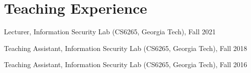 \section*{Teaching Experience}
\begin{description}

\item Lecturer, Information Security Lab (CS6265, Georgia Tech), Fall 2021
\item Teaching Assistant, Information Security Lab (CS6265, Georgia Tech), Fall 2018 
\item Teaching Assistant, Information Security Lab (CS6265, Georgia Tech), Fall 2016

\end{description}
